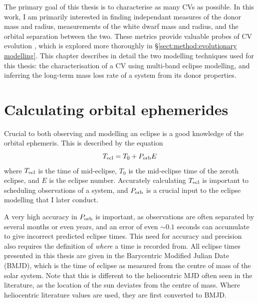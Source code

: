 \label{chpt:modelling and techniques} %



The primary goal of this thesis is to characterise as many CVs as possible. In this work, I am primarily interested in finding independant measures of the donor mass and radius, measurements of the white dwarf mass and radius, and the orbital separation between the two. These metrics provide valuable probes of CV evolution \citep{knigge2006}, which is explored more thoroughly in \S\ref{sect:method:evolutionary modelling}. 
This chapter describes in detail the two modelling techniques used for this thesis: the characterisation of a CV using multi-band eclipse modelling, and inferring the long-term mass loss rate of a system from its donor properties.


\section{Calculating orbital ephemerides}
\label{sect:modelling:calculating ephemeris}

Crucial to both observing and modelling an eclipse is a good knowledge of the orbital ephemeris. This is described by the equation
\begin{equation}
    \label{eqn:modelling:general ephemeris equation}
    T_{\rm ecl} = T_0 + P_{\rm orb} E
\end{equation}
where $T_{\rm ecl}$ is the time of mid-eclipse, $T_0$ is the mid-eclipse time of the zeroth eclipse, and $E$ is the eclipse number. Accurately calculating $T_{\rm ecl}$ is important to scheduling observations of a system, and $P_{\rm orb}$ is a crucial input to the eclipse modelling that I later conduct. 

A very high accuracy in $P_{\rm orb}$ is important, as observations are often separated by several months or even years, and an error of even $\sim 0.1$ seconds can accumulate to give incorrect predicted eclipse times. This need for accuracy and precision also requires the definition of {\it where} a time is recorded from. All eclipse times presented in this thesis are given in the Barycentric Modified Julian Date (BMJD), which is the time of eclipse as measured from the centre of mass of the solar system. Note that this is different to the heliocentric MJD often seen in the literature, as the location of the sun deviates from the centre of mass. Where heliocentric literature values are used, they are first converted to BMJD. 

